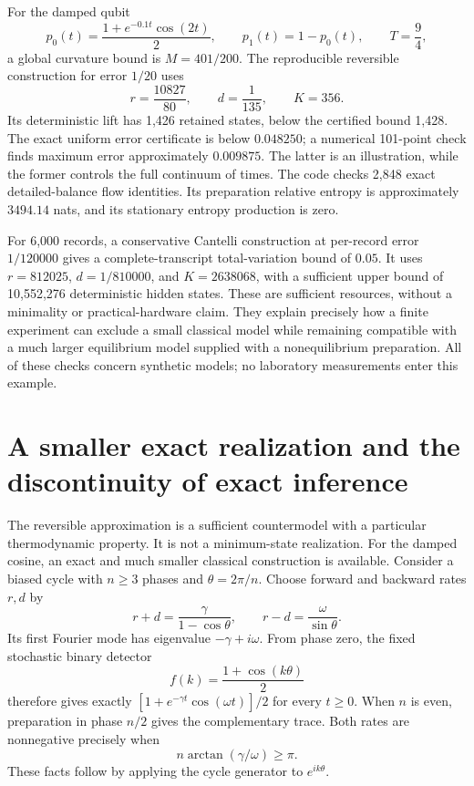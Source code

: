 For the damped qubit
\[
 p_0(t)=\frac{1+e^{-0.1t}\cos(2t)}2,\qquad p_1(t)=1-p_0(t),
 \qquad T=\frac94,
\]
a global curvature bound is $M=401/200$. The reproducible reversible
construction for error $1/20$ uses
\[
 r=\frac{10827}{80},\qquad d=\frac1{135},\qquad K=356.
\]
Its deterministic lift has 1,426 retained states, below the certified bound
1,428. The exact uniform error certificate is below $0.048250$; a numerical
101-point check finds maximum error approximately $0.009875$. The latter is
an illustration, while the former controls the full continuum of times.
The code checks 2,848 exact detailed-balance flow identities. Its preparation
relative entropy is approximately $3494.14$ nats, and its stationary entropy
production is zero.

For 6,000 records, a conservative Cantelli construction at per-record error
$1/120000$ gives a complete-transcript total-variation bound of $0.05$.
It uses $r=812025$, $d=1/810000$, and $K=2638068$, with a sufficient upper
bound of 10,552,276 deterministic hidden states. These are sufficient
resources, without a minimality or practical-hardware claim. They explain
precisely how a finite experiment can exclude a small classical model while
remaining compatible with a much larger equilibrium model supplied with a
nonequilibrium preparation. All of these checks concern synthetic models;
no laboratory measurements enter this example.

\section{A smaller exact realization and the discontinuity of exact inference}

The reversible approximation is a sufficient countermodel with a particular
thermodynamic property. It is not a minimum-state realization. For the damped
cosine, an exact and much smaller classical construction is available.
Consider a biased cycle with $n\ge3$ phases and $\theta=2\pi/n$. Choose forward
and backward rates $r,d$ by
\begin{equation}
 r+d=\frac{\gamma}{1-\cos\theta},\qquad
 r-d=\frac{\omega}{\sin\theta}.
 \label{rf:cyclic-rates}
\end{equation}
Its first Fourier mode has eigenvalue $-\gamma+i\omega$. From phase zero,
the fixed stochastic binary detector
\[
 f(k)=\frac{1+\cos(k\theta)}2
\]
therefore gives exactly
$[1+e^{-\gamma t}\cos(\omega t)]/2$ for every $t\ge0$. When $n$ is even,
preparation in phase $n/2$ gives the complementary trace.
Both rates are nonnegative precisely when
\begin{equation}
 n\arctan(\gamma/\omega)\ge\pi.
 \label{rf:cycle-size}
\end{equation}
These facts follow by applying the cycle generator to $e^{ik\theta}$.

